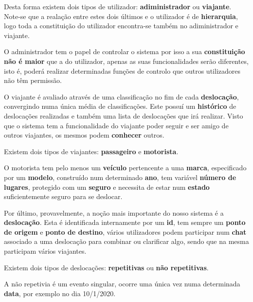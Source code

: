 \hspace{5mm} Desta forma existem dois tipos de utilizador: \textbf{adiministrador} ou \textbf{viajante}. Note-se que a realação entre estes dois últimos e o utilizador é de \textbf{hierarquia}, logo toda a constituição do utilizador encontra-se também no adiministrador e viajante.

\hspace{5mm} O administrador tem o papel de controlar o sistema por isso a sua \textbf{constituição não é maior} que a do utilizador, apenas as suas funcionalidades serão diferentes, isto é, poderá realizar determinadas funções de controlo que outros utilizadores não têm permissão.

\hspace{5mm} O viajante é avaliado através de uma classificação no fim de cada \textbf{deslocação}, convergindo numa única média de classificações. Este possuí um \textbf{histórico} de deslocações realizadas e também uma lista de deslocações que irá realizar. Visto que o sistema tem a funcionalidade do viajante poder seguir e ser amigo de outros viajantes, os mesmos podem \textbf{conhecer} outros. 

\hspace{5mm} Existem dois tipos de viajantes: \textbf{passageiro} e \textbf{motorista}. 

\hspace{5mm} O motorista tem pelo menos um \textbf{veículo} pertencente a uma \textbf{marca}, especificado por um \textbf{modelo}, construído num determinado \textbf{ano}, tem variável \textbf{número de lugares}, protegido com um \textbf{seguro} e necessita de estar num \textbf{estado} suficientemente seguro para se deslocar.

\hspace{5mm} Por último, provavelmente, a noção mais importante do nosso sistema é a \textbf{deslocação}. Esta é identificada internamente por um \textbf{id}, tem sempre um \textbf{ponto de origem} e \textbf{ponto de destino}, vários utilizadores podem participar num \textbf{chat} associado a uma deslocação para combinar ou clarificar algo, sendo que na mesma participam vários viajantes.

\hspace{5mm} Existem dois tipos de deslocações: \textbf{repetitivas} ou \textbf{não repetitivas}. 

\hspace{5mm} A não repetivia é um evento singular, ocorre uma única vez numa determinada \textbf{data}, por exemplo no dia 10/1/2020.


